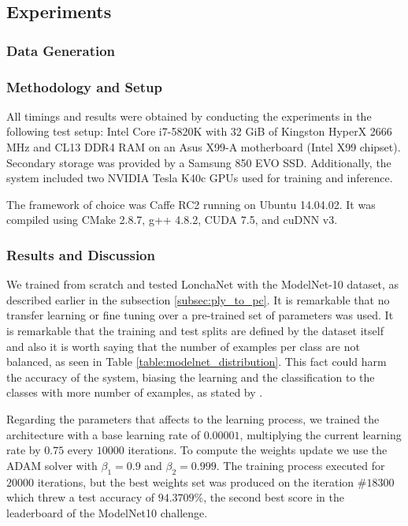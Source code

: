 \subsection{Experiments}
\label{cha:objrecog:sec:lonchanet:subsec:experiments}

\subsubsection{Data Generation}
\label{cha:objrecog:sec:lonchanet:subsec:experiments:subsubsec:data}

\subsubsection{Methodology and Setup}
\label{cha:objrecog:sec:lonchanet:subsec:experiments:subsubsec:methodology}

All timings and results were obtained by conducting the experiments in the following test setup: Intel Core i7-5820K with 32 GiB of Kingston HyperX 2666 MHz and CL13 DDR4 RAM on an Asus X99-A motherboard (Intel X99 chipset). Secondary storage was provided by a Samsung 850 EVO SSD. Additionally, the system included two NVIDIA Tesla K40c \acp{GPU} used for training and inference.

The framework of choice was Caffe RC2 running on Ubuntu 14.04.02. It was compiled using CMake 2.8.7, g++ 4.8.2, CUDA 7.5, and cuDNN v3.

\subsubsection{Results and Discussion}
\label{cha:objrecog:sec:lonchanet:subsec:experiments:subsubsec:results}

We trained from scratch and tested LonchaNet with the ModelNet-10 dataset, as described earlier in the subsection \ref{subsec:ply_to_pc}. It is remarkable that no transfer learning or fine tuning over a pre-trained set of parameters was used. It is remarkable that the training and test splits are defined by the dataset itself and also it is worth saying that the number of examples per class are not balanced, as seen in Table \ref{table:modelnet_distribution}. This fact could harm the accuracy of the system, biasing the learning and the classification to the classes with more number of examples, as stated by \cite{He2009}.

Regarding the parameters that affects to the learning process, we trained the architecture with a base learning rate of $0.00001$, multiplying the current learning rate by $0.75$ every $10000$ iterations. To compute the weights update we use the ADAM \cite{KingmaB14} solver with $\beta_1=0.9$ and $\beta_2=0.999$. The training process executed for $20000$ iterations, but the best weights set was produced on the iteration $\#18300$ which threw a test accuracy of $94.3709$\%, the second best score in the leaderboard of the ModelNet10 challenge.

